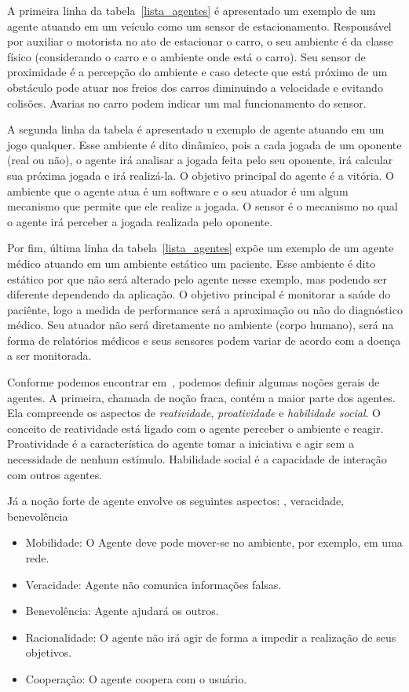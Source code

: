 A primeira linha da tabela~\ref{lista_agentes} é apresentado um exemplo de um agente atuando em um veículo como um sensor de estacionamento. Responsável por auxiliar o motorista no ato de estacionar o carro, o seu ambiente é da classe físico (considerando o carro e o ambiente onde está o carro). Seu sensor de proximidade é a percepção do ambiente e caso detecte que está próximo de um obstáculo pode atuar nos freios dos carros diminuindo a velocidade e evitando colisões. Avarias no carro podem indicar um mal funcionamento do sensor.

A segunda linha da tabela é apresentado u exemplo de agente atuando em um jogo qualquer. Esse ambiente é dito dinâmico, pois a cada jogada de um oponente (real ou não), o agente irá analisar a jogada feita pelo seu oponente, irá calcular sua próxima jogada e irá realizá-la. O objetivo principal do agente é a vitória. O ambiente que o agente atua é um software e o seu atuador é um algum mecanismo que permite que ele realize a jogada. O sensor é o mecanismo no qual o agente irá perceber a jogada realizada pelo oponente.

Por fim, última linha da tabela~\ref{lista_agentes} expõe um exemplo de um agente médico atuando em um ambiente estático um paciente. Esse ambiente é dito estático por que não será alterado pelo agente nesse exemplo, mas podendo ser diferente dependendo da aplicação. O objetivo principal é monitorar a saúde do paciênte, logo a medida de performance será a aproximação ou não do diagnóstico médico. Seu atuador não será diretamente no ambiente (corpo humano), será na forma de relatórios médicos e seus sensores podem variar de acordo com a doença a ser monitorada.

Conforme podemos encontrar em~\cite{wooldridge04}, podemos definir algumas noções gerais de agentes. A primeira, chamada de noção fraca, contém a maior parte dos agentes. Ela compreende os aspectos de \emph{reatividade}, \emph{proatividade} e \emph{habilidade social}. O conceito de reatividade  está ligado com o agente perceber o ambiente e reagir. Proatividade é a característica do agente tomar a iniciativa e agir sem a necessidade de nenhum estímulo. Habilidade social é a capacidade de interação com outros agentes.

Já a noção forte de agente envolve os seguintes aspectos: , veracidade, benevolência
\begin{itemize}
	\item Mobilidade: O Agente deve pode mover-se no ambiente, por exemplo, em uma rede.
	\item Veracidade: Agente não comunica informações falsas.
	\item Benevolência: Agente ajudará os outros.
	\item Racionalidade: O agente não irá agir de forma a impedir a realização de seus objetivos.
	\item Cooperação: O agente coopera com o usuário.
\end{itemize}

